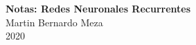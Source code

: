 \documentclass[11pt]{article}
\begin{document}
\setmainfont{Carlito}

\thispagestyle{empty}

\begin{center}
{\LARGE \bf Notas: Redes Neuronales Recurrentes}\\
{\large Martin Bernardo Meza}\\
2020
\end{center}




\newpage
\end{document}
